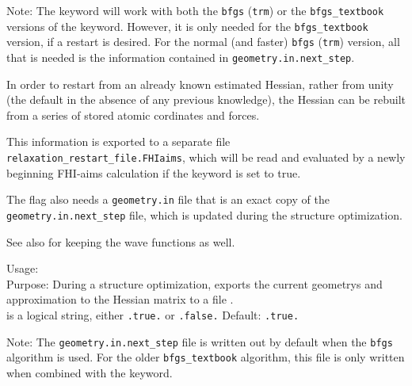 Note: The  keyword will work with both
the \texttt{bfgs} (\texttt{trm}) or the \texttt{bfgs\_textbook}
versions of the  keyword. However, it is only
needed for the \texttt{bfgs\_textbook} version, if a restart is
desired. For the normal (and faster) \texttt{bfgs} (\texttt{trm})
version, all that is needed is the information contained in
\texttt{geometry.in.next\_step}. 

In order to restart
from an already known estimated Hessian, rather from unity (the
default in the absence of any previous knowledge), the Hessian can be
rebuilt from a series of stored atomic cordinates and forces.  

This information is exported to a separate file
\texttt{relaxation\_restart\_file.FHIaims}, which will be read and
evaluated by a newly beginning FHI-aims calculation if the
 keyword is set to true.

The flag also needs a \texttt{geometry.in} file that is an exact copy
of the \texttt{geometry.in.next\_step} file, which is updated during
the structure optimization.

See also  for keeping the wave functions as well. 

{
  \noindent
  Usage:   \\
  Purpose: During a structure optimization, exports the current
  geometrys and approximation to the Hessian matrix to a file 
  . \\ 
   is a logical string, either \texttt{.true.} or
    \texttt{.false.} Default: \texttt{.true.} \\
}

Note: The \texttt{geometry.in.next\_step} file is written out by
default when the  \texttt{bfgs} algorithm
is used. For the older \texttt{bfgs\_textbook} algorithm, this file is
only written when combined with the 
keyword. 


